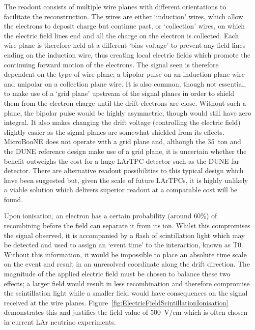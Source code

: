 The readout consists of multiple wire planes with different orientations to facilitate the reconstruction.  The wires are either `induction' wires, which allow the electrons to deposit charge but continue past, or `collection' wires, on which the electric field lines end and all the charge on the electron is collected.  Each wire plane is therefore held at a different `bias voltage' to prevent any field lines ending on the induction wire, thus creating local electric fields which promote the continuing forward motion of the electrons.  The signal seen is therefore dependent on the type of wire plane; a bipolar pulse on an induction plane wire and unipolar on a collection plane wire.  It is also common, though not essential, to make use of a `grid plane' upstream of the signal planes in order to shield them from the electron charge until the drift electrons are close.  Without such a plane, the bipolar pulse would be highly asymmetric, though would still have zero integral.  It also makes changing the drift voltage (controlling the electric field) slightly easier as the signal planes are somewhat shielded from its effects.  MicroBooNE does not operate with a grid plane and, although the 35~ton and the DUNE reference design make use of a grid plane, it is uncertain whether the benefit outweighs the cost for a huge LArTPC detector such as the DUNE far detector.  There are alternative readout possibilities to this typical design which have been suggested but, given the scale of future LArTPCs, it is highly unlikely a viable solution which delivers superior readout at a comparable cost will be found.

Upon ionisation, an electron has a certain probability (around 60\%) of recombining before the field can separate it from its ion.  Whilst this compromises the signal observed, it is accompanied by a flash of scintillation light which may be detected and used to assign an `event time' to the interaction, known as T0.  Without this information, it would be impossible to place an absolute time scale on the event and result in an unresolved coordinate along the drift direction.  The magnitude of the applied electric field must be chosen to balance these two effects; a larger field would result in less recombination and therefore compromise the scintillation light while a smaller field would have consequences on the signal received at the wire planes.  Figure~\ref{fig:ElectricFieldScintillationIonisation} demonstrates this and justifies the field value of 500~V/cm which is often chosen in current LAr neutrino experiments.

